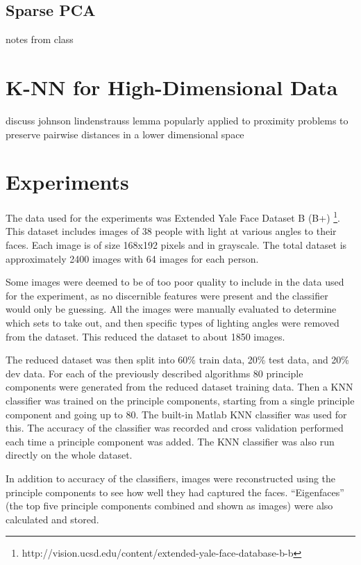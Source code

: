\documentclass[11pt,letterpaper]{article}
\begin{document}
\subsection{Sparse PCA}

notes from class


\section{K-NN for High-Dimensional Data}

discuss johnson lindenstrauss lemma popularly applied to proximity problems to preserve pairwise distances in a lower dimensional space

\section{Experiments}

The data used for the experiments was Extended Yale Face Dataset B (B+) \footnote{{http://vision.ucsd.edu/content/extended-yale-face-database-b-b}}. This dataset includes images of 38 people with light at various angles to their faces. Each image is of size 168x192 pixels and in grayscale. The total dataset is approximately 2400 images with 64 images for each person. 

Some images were deemed to be of too poor quality to include in the data used for the experiment, as no discernible features were present and the classifier would only be guessing. All the images were manually evaluated to determine which sets to take out, and then specific types of lighting angles were removed from the dataset. This reduced the dataset to about 1850 images. 

The reduced dataset was then split into 60\% train data, 20\% test data, and 20\% dev data. For each of the previously described algorithms 80 principle components were generated from the reduced dataset training data. Then a KNN classifier was trained on the principle components, starting from a single principle component and going up to 80. The built-in Matlab KNN classifier was used for this. The accuracy of the classifier was recorded and cross validation performed each time a principle component was added. The KNN classifier was also run directly on the whole dataset. 

In addition to accuracy of the classifiers, images were reconstructed using the principle components to see how well they had captured the faces. ``Eigenfaces'' (the top five principle components combined and shown as images) were also calculated and stored. 
\end{document}
